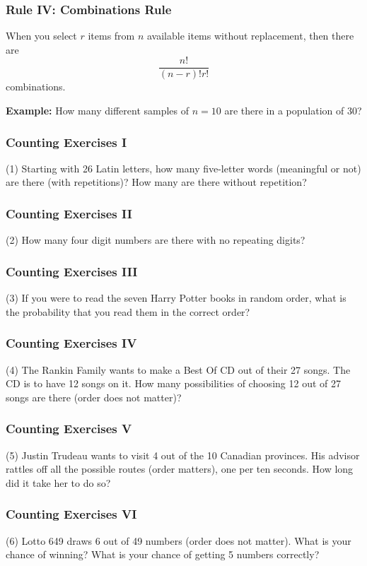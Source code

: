 \documentclass[xcolor=dvipsnames]{beamer}
\begin{document}
\begin{frame}
  \frametitle{Rule IV: Combinations Rule}
When you select $r$ items from $n$ available items \alert{without
  replacement}, then there are
\begin{equation}
  \label{eq:aibireik}
  \frac{n!}{(n-r)!r!}
\end{equation}
combinations.

\bigskip

\textbf{Example:} How many different samples of $n=10$ are there in a
population of 30?
\end{frame}

\begin{frame}
  \frametitle{Counting Exercises I}
(1) Starting with 26 Latin letters, how many five-letter words
(meaningful or not) are there (with repetitions)? How many are there
without repetition?
\end{frame}

\begin{frame}
  \frametitle{Counting Exercises II}
(2) How many four digit numbers are there with no repeating digits?
\end{frame}

\begin{frame}
  \frametitle{Counting Exercises III}
(3) If you were to read the seven Harry Potter books in random order,
what is the probability that you read them in the correct order?
\end{frame}

\begin{frame}
  \frametitle{Counting Exercises IV}
(4) The Rankin Family wants to make a Best Of CD out of their 27
songs. The CD is to have 12 songs on it. How many possibilities of
choosing 12 out of 27 songs are there (order does not matter)?
\end{frame}

\begin{frame}
  \frametitle{Counting Exercises V}
(5) Justin Trudeau wants to visit 4 out of the 10 Canadian provinces.
His advisor rattles off all the possible routes (order matters), one
per ten seconds. How long did it take her to do so?
\end{frame}

\begin{frame}
  \frametitle{Counting Exercises VI}
(6) Lotto 649 draws 6 out of 49 numbers (order does not matter). What
is your chance of winning? What is your chance of getting 5 numbers
correctly?
\end{frame}
\end{document}

